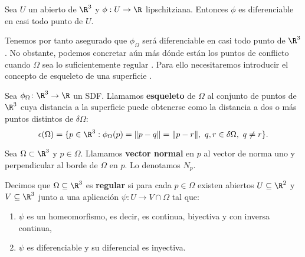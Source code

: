 \begin{lema}
    Sea $U$ un abierto de $\R^3$ y $\phi:U\to \R$ lipschitziana. Entonces $\phi$ es diferenciable en casi todo punto de $U$.
\end{lema}

Tenemos por tanto asegurado que $\phi_{\Omega}$ será diferenciable en casi todo punto de $\R^3$. No obstante, podemos concretar aún más dónde están los puntos de conflicto cuando $\Omega$ sea lo suficientemente regular \cite{dif1,dif2}. Para ello necesitaremos introducir el concepto de esqueleto de una superficie \cite{derivWiki}.
\begin{definicion}
    Sea $\phi_{\Omega} \colon \R^3\to \R$ un SDF. Llamamos \textbf{esqueleto} de $\Omega$ al conjunto de puntos de $\R^3$ cuya distancia a la superficie puede obtenerse como la distancia a dos o más puntos distintos de $\delta \Omega$:
    \begin{equation}
        \epsilon(\Omega) = \{p\in \R^3 : \phi_{\Omega}(p) = \Vert p-q\Vert = \Vert p-r\Vert,\ q,r\in \delta\Omega ,\ q\neq r \}.
    \end{equation}
\end{definicion}

\begin{definicion}
    Sea $\Omega \subset \R^3$ y $p\in \Omega$. Llamamos \textbf{vector normal} en $p$ al vector de norma uno y perpendicular al borde de $\Omega$ en $p$. Lo denotamos $N_p$.
\end{definicion}

\begin{definicion}
    Decimos que $\Omega \subseteq \R^3$ es \textbf{regular} si para cada $p\in \Omega$ existen abiertos $U\subseteq \R^2$ y $V\subseteq \R^3$ junto a una aplicación $\psi\colon U \to V\cap \Omega$ tal que:
    \begin{enumerate}
        \item $\psi$ es un homeomorfismo, es decir, es continua, biyectiva y con inversa continua,
        \item $\psi$ es diferenciable y su diferencial es inyectiva.
    \end{enumerate}
\end{definicion}

